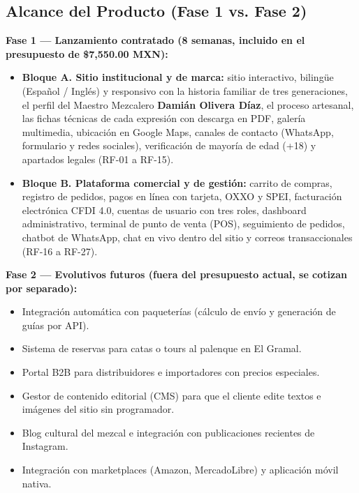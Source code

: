 \documentclass[11pt,letterpaper]{article}
\begin{document}
\subsection{Alcance del Producto (Fase 1 vs. Fase 2)}

\textbf{Fase 1 — Lanzamiento contratado (8 semanas, incluido en el presupuesto de \$7,550.00 MXN):}
\begin{itemize}[leftmargin=1.5em]
    \item \textbf{Bloque A. Sitio institucional y de marca:} sitio interactivo, bilingüe (Español / Inglés) y responsivo con la historia familiar de tres generaciones, el perfil del Maestro Mezcalero \textbf{Damián Olivera Díaz}, el proceso artesanal, las fichas técnicas de cada expresión con descarga en PDF, galería multimedia, ubicación en Google Maps, canales de contacto (WhatsApp, formulario y redes sociales), verificación de mayoría de edad (+18) y apartados legales (RF-01 a RF-15).
    \item \textbf{Bloque B. Plataforma comercial y de gestión:} carrito de compras, registro de pedidos, pagos en línea con tarjeta, OXXO y SPEI, facturación electrónica CFDI 4.0, cuentas de usuario con tres roles, dashboard administrativo, terminal de punto de venta (POS), seguimiento de pedidos, chatbot de WhatsApp, chat en vivo dentro del sitio y correos transaccionales (RF-16 a RF-27).
\end{itemize}

\textbf{Fase 2 — Evolutivos futuros (fuera del presupuesto actual, se cotizan por separado):}
\begin{itemize}[leftmargin=1.5em]
    \item Integración automática con paqueterías (cálculo de envío y generación de guías por API).
    \item Sistema de reservas para catas o tours al palenque en El Gramal.
    \item Portal B2B para distribuidores e importadores con precios especiales.
    \item Gestor de contenido editorial (CMS) para que el cliente edite textos e imágenes del sitio sin programador.
    \item Blog cultural del mezcal e integración con publicaciones recientes de Instagram.
    \item Integración con marketplaces (Amazon, MercadoLibre) y aplicación móvil nativa.
\end{itemize}
\end{document}
